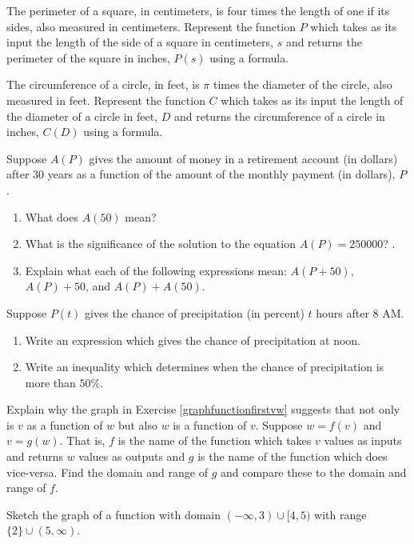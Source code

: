 \begin{tasks}[resume]
\task  The perimeter of a square, in centimeters,  is four times the length of one if its sides, also measured in centimeters.  Represent the function $P$ which takes as its input the length of the side of a square in centimeters, $s$ and returns the perimeter of the square in inches, $P(s)$ using a formula.

\task  The circumference of a circle, in feet,  is $\pi$ times the diameter of the circle, also measured in feet.  Represent the function $C$ which takes as its input the length of the diameter of a circle in feet, $D$ and returns the circumference of a circle in inches, $C(D)$ using a formula.

\task  Suppose $A(P)$ gives the amount of money in a retirement account (in dollars) after 30 years as a function of the amount of the monthly payment (in dollars), $P$.

\begin{enumerate}[label=(\alph*)]

\item What does $A(50)$ mean?  

\item  What is the significance of the solution to the equation $A(P) = 250000$? .

\item  Explain what each of the following expressions mean:  $A(P+50)$, $A(P)+50$, and $A(P) + A(50)$.  

\end{enumerate}

\task  Suppose $P(t)$ gives the chance of precipitation (in percent)  $t$ hours after 8 AM.

\begin{enumerate}[label=(\alph*)]

\item  Write an expression which gives the chance of precipitation at noon.

\item  Write an inequality which determines when the chance of precipitation is more than $50 \%$.

\end{enumerate}


\task Explain why the graph in  Exercise \ref{graphfunctionfirstvw}  suggests that not only is $v$ as a function of $w$ but also $w$ is a function of $v$.  Suppose $w = f(v)$ and $v = g(w)$.  That is, $f$ is the name of the function which takes $v$ values as inputs and returns $w$ values as outputs and $g$ is the name of the function which does vice-versa.   Find the domain and range of  $g$ and compare these to the domain and range of $f$.  

\task  Sketch the graph of a function with domain $(-\infty, 3) \cup [4,5)$ with range $\{ 2 \} \cup (5, \infty)$.

\end{tasks}



